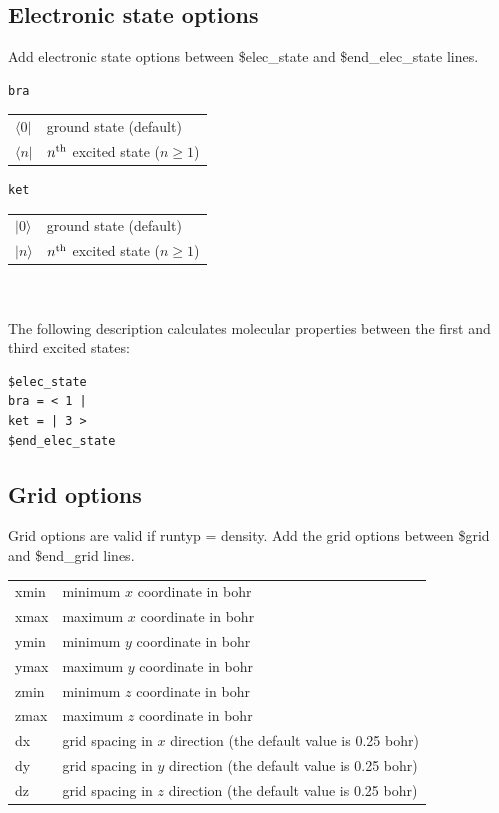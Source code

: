 ﻿\documentclass[11pt,a4paper,openany]{article}
\begin{document}
\subsection{Electronic state options}
\noindent
Add electronic state options between \$elec\_state and \$end\_elec\_state lines.
\begin{verbatim}
bra
\end{verbatim}
\begin{tabular}{ll}
$\langle 0 |$ & ground state (default)\\
$\langle n |$ & $n^{\rm{th}}$ excited state ($n \geq 1$)
\end{tabular}
\begin{verbatim}
ket
\end{verbatim}
\begin{tabular}{ll}
$| 0 \rangle$ & ground state (default)\\
$| n \rangle$ & $n^{\rm{th}}$ excited state ($n \geq 1$)
\end{tabular}
\\
\vspace{5mm} 
\\
The following description calculates molecular properties between the first and third excited states:
\begin{verbatim}
$elec_state
bra = < 1 |
ket = | 3 >
$end_elec_state
\end{verbatim}

\clearpage
\subsection{Grid options}
\noindent
Grid options are valid if runtyp = density.
Add the grid options between \$grid and \$end\_grid lines.\\

\begin{tabular}{ll}
xmin & minimum $x$ coordinate in bohr\\
xmax & maximum $x$ coordinate in bohr\\
ymin & minimum $y$ coordinate in bohr\\
ymax & maximum $y$ coordinate in bohr\\
zmin & minimum $z$ coordinate in bohr\\
zmax & maximum $z$ coordinate in bohr\\
dx & grid spacing in $x$ direction (the default value is 0.25 bohr)\\
dy & grid spacing in $y$ direction (the default value is 0.25 bohr)\\
dz & grid spacing in $z$ direction (the default value is 0.25 bohr)
\end{tabular}
\\
\end{document}
